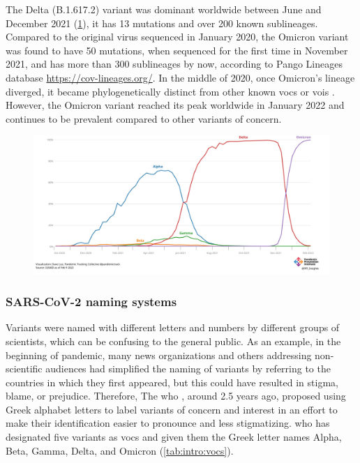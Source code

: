         The Delta (B.1.617.2) variant was dominant worldwide between June and December 2021 (\cref{fig:intro:voc-growth}), it has 13 mutations and over 200 known sublineages. Compared to the original virus sequenced in January 2020, the Omicron variant was found to have 50 mutations, when sequenced for the first time in November 2021, and has more than 300 sublineages by now, according to Pango Lineages database \url{https://cov-lineages.org/}. In the middle of 2020, once Omicron's lineage diverged, it became phylogenetically distinct from other known \acrshort{vocs} or \acrshort{vois} \cite{otoole2021}. However, the Omicron variant reached its peak worldwide in January 2022 and continues to be prevalent compared to other variants of concern. 
        
        \begin{figure}[ht!]
            \centering
        	\includegraphics[width=1\textwidth]{figures/intro/voc-growth.png}
        	\label{fig:intro:voc-growth}
        \end{figure}
        
        \subsubsection{SARS-CoV-2 naming systems}
        Variants were named with different letters and numbers by different groups of scientists, which can be confusing to the general public. As an example, in the beginning of pandemic, many news organizations and others addressing non-scientific audiences had simplified the naming of variants by referring to the countries in which they first appeared, but this could have resulted in stigma, blame, or prejudice. Therefore, The \acrlong{who} \cite{tracking}, around 2.5 years ago, proposed using Greek alphabet letters to label variants of concern and interest in an effort to make their identification easier to pronounce and less stigmatizing. \acrshort{who} has designated five variants as \acrshort{vocs} and given them the Greek letter names Alpha, Beta, Gamma, Delta, and Omicron (\cref{tab:intro:vocs}).
        
